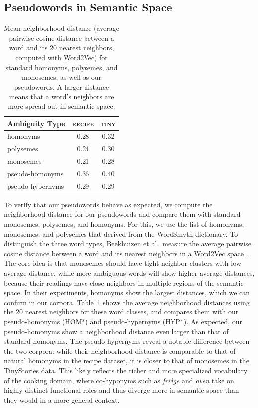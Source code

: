 \documentclass[final]{clv2025}
\begin{document}
\subsection{Pseudowords in Semantic Space}\label{sec:space}
\begin{table}
\centering
\begin{tabular}{lcc}
\toprule
Ambiguity Type & \textsc{recipe} & \textsc{tiny} \\
\midrule
homonyms    & 0.28 & 0.32 \\
polysemes    & 0.24 & 0.30 \\
monosemes    & 0.21 & 0.28\\ \midrule
pseudo-homonyms & 0.36 & 0.40  \\
pseudo-hypernyms & 0.29 & 0.29 \\
\bottomrule
\end{tabular}
\caption{Mean neighborhood distance (average pairwise cosine distance between a word and its 20 nearest neighbors, computed with Word2Vec) for standard homonyms, polysemes, and monosemes, as well as our pseudowords. A larger distance means that a word's neighbors are more spread out in semantic space.}
\label{tab:neighborhood}
\end{table}
To verify that our pseudowords behave as expected, we compute the neighborhood distance for our pseudowords and compare them with standard monosemes, polysemes, and homonyms. For this, we use the list of homonyms, monosemes, and polysemes that \citet{https://doi.org/10.1111/cogs.12943} derived from the WordSmyth dictionary. To distinguish the three word types, Beekhuizen et al.\ measure the average pairwise cosine distance between a word and its nearest neighbors in a Word2Vec space \cite{NIPS2013_9aa42b31}. The core idea is that monosemes should have tight neighbor clusters with low average distance, while more ambiguous words will show higher average distances, because their readings have close neighbors in multiple regions of the semantic space. In their experiments, homonyms show the largest distances, which we can confirm in our corpora.
Table~\ref{tab:neighborhood} shows the average neighborhood distances using the 20 nearest neighbors for these word classes, and compares them with our pseudo-homonyms (HOM*) and pseudo-hypernyms (HYP*). As expected, our pseudo-homonyms show a neighborhood distance even larger than that of standard homonyms. The pseudo-hypernyms reveal a notable difference between the two corpora: while their neighborhood distance is comparable to that of natural homonyms in the recipe dataset, it is closer to that of monosemes in the TinyStories data. This likely reflects the richer and more specialized vocabulary of the cooking domain, where co-hyponyms such as \emph{fridge} and \emph{oven} take on highly distinct functional roles and thus diverge more in semantic space than they would in a more general context.
\end{document}
